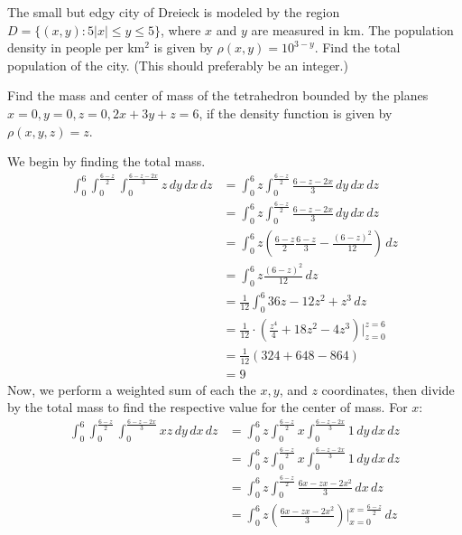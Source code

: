 \documentclass[12pt]{exam}
\begin{document}
\begin{questions}
\begin{solution}
    \end{solution}

\question  The small but edgy city of Dreieck is modeled by the region $D = \{ (x, y) : 5 |x| \leq y \leq 5\}$, where $x$ and $y$ are measured in km. The population density in people per km$^2$ is given by $\rho(x, y) = 10^{3-y}$. Find the total population of the city. (This should preferably be an integer.)

\question  Find the mass and center of mass of the tetrahedron bounded by the planes $x = 0, y = 0, z = 0,
2x + 3y + z = 6$, if the density function is given by $\rho(x, y, z) = z$.
    \begin{solution}
        We begin by finding the total mass.
        \begin{align*}
            \int_{0}^{6}\int_{0}^{\frac{6 - z}{2}}\int_{0}^{\frac{6 - z - 2x}{3}} z\, dy\, dx\, dz &= \int_{0}^{6}z\int_{0}^{\frac{6 - z}{2}}\frac{6 - z - 2x}{3} \, dy\, dx\, dz\\
            &= \int_{0}^{6}z\int_{0}^{\frac{6 - z}{2}} \frac{6 - z - 2x}{3}\, dy\, dx\, dz \\
            &= \int_{0}^{6} z\left(\frac{6 - z}{2} \frac{6 - z}{3} - \frac{(6 - z)^2}{12}\right)\, dz \\
            &= \int_{0}^{6}z \frac{(6 - z)^2}{12} \, dz \\
            &= \frac{1}{12}\int_{0}^{6} 36z - 12z^2 + z^3 \, dz \\
            &= \frac{1}{12} \cdot \left(\frac{z^4}{4} + 18z^2 - 4z^3  \right)|_{z=0}^{z=6} \\
            &= \frac{1}{12}(324 + 648 - 864) \\
            &= \boxed{9}
        \end{align*}
        Now, we perform a weighted sum of each the $x, y$, and $z$ coordinates, then divide by the total mass to find the respective value for the center of mass.
        For $x$:
        \begin{align*}
            \int_{0}^{6}\int_{0}^{\frac{6 - z}{2}}\int_{0}^{\frac{6 - z - 2x}{3}} xz\, dy\, dx\, dz &= \int_{0}^{6}z\int_{0}^{\frac{6 - z}{2}}x\int_{0}^{\frac{6 - z - 2x}{3}} 1 \, dy\, dx\, dz \\ 
            &= \int_{0}^{6}z\int_{0}^{\frac{6 - z}{2}}x\int_{0}^{\frac{6 - z - 2x}{3}} 1 \, dy \, dx\, dz \\
            &= \int_{0}^{6}z \int_{0}^{\frac{6 - z}{2}}\frac{6x - zx - 2x^2}{3} \, dx\, dz \\
            &= \int_{0}^{6}z \left(\frac{6x - zx - 2x^2}{3}\right)|_{x=0}^{x = \frac{6 - z}{2}} \, dz
        \end{align*} 
    \end{solution}


\end{questions}
\end{document}

